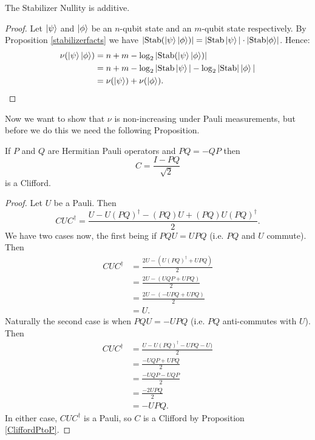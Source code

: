 \documentclass[12pt]{dalthesis}
\begin{document}
\begin{proposition}
The Stabilizer Nullity is additive.
\end{proposition}
\begin{proof}
Let $\ket{\psi}$ and $\ket{\phi}$ be an $n$-qubit state and an $m$-qubit state respectively. By Proposition \ref{stabilizerfacts} we have $|\mathrm{Stab}(\ket{\psi} \ket{\phi})| = |\mathrm{Stab}\ket{\psi}| \cdot |\mathrm{Stab}{\ket{\phi}}|$. Hence:
\begin{equation*}
\begin{split}
\nu (\ket{\psi}\ket{\phi}) & = n + m - \log_2 |\mathrm{Stab} (\ket{\psi}\ket{\phi})| \\
& = n + m - \log_2 |\mathrm{Stab} \ket{\psi}| - \log_2|\mathrm{Stab}|\ket{\phi}| \\
& = \nu(\ket{\psi}) + \nu (\ket{\phi}).
\end{split}
\end{equation*}
\end{proof}

Now we want to show that $\nu$ is non-increasing under Pauli measurements, but before we do this we need the following Proposition.

\begin{proposition}
\label{ClifUnitary}
If $P$ and $Q$ are Hermitian Pauli operators and $PQ = - QP$ then 
\begin{equation*}
C = \frac{I -PQ}{\sqrt{2}}
\end{equation*}
is a Clifford.
\end{proposition}
\begin{proof}
Let $U$ be a Pauli. Then 
\begin{equation*}
CUC^\dag = \frac{U-U(PQ)^\dag - (PQ)U + (PQ)U(PQ)^\dag}{2}.
\end{equation*}
We have two cases now, the first being if $PQU = UPQ$ (i.e. $PQ$ and $U$ commute). Then 
\begin{equation*}
\begin{split}
CUC^\dag & = \frac{2U - (U(PQ)^\dag + UPQ)}{2} \\
& = \frac{2U - (UQP + UPQ)}{2} \\
& = \frac{2U - (-UPQ + UPQ)}{2} \\
& = U.
\end{split}
\end{equation*}
Naturally the second case is when $PQU = -UPQ$ (i.e. $PQ$ anti-commutes with $U$). Then
\begin{equation*}
\begin{split}
CUC^\dag & = \frac{U - U(PQ)^\dag - UPQ - U)}{2} \\
& = \frac{-UQP + UPQ}{2} \\
& = \frac{-UQP - UQP}{2} \\
& = \frac{-2UPQ}{2} \\
& = -UPQ.
\end{split}
\end{equation*}
In either case, $CUC^\dag$ is a Pauli, so $C$ is a Clifford by Proposition \ref{CliffordPtoP}.
\end{proof}
\end{document}
